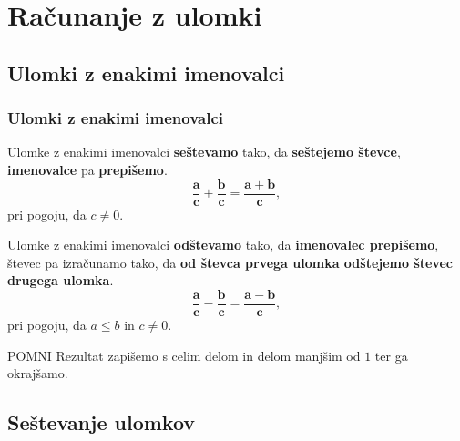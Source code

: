 \section{Računanje z ulomki}

\begin{frame}
    \sectionpage
\end{frame}

\begin{frame}
\end{frame}

    \subsection{Ulomki z enakimi imenovalci}

        \begin{frame}[t]
            \frametitle{Ulomki z enakimi imenovalci}

            \begin{alertblock}{}
                Ulomke z enakimi imenovalci \textbf{seštevamo} tako, da \textbf{seštejemo števce}, \textbf{imenovalce} pa \textbf{prepišemo}.
                $$ \mathbf{\frac{a}{c}+\frac{b}{c}=\frac{a+b}{c}}, $$ pri pogoju, da $c\neq 0$.

                Ulomke z enakimi imenovalci \textbf{odštevamo} tako, da \textbf{imenovalec prepišemo}, števec pa izračunamo tako, da \textbf{od števca prvega ulomka odštejemo števec drugega ulomka}.
                $$ \mathbf{\frac{a}{c}-\frac{b}{c}=\frac{a-b}{c}}, $$ pri pogoju, da $a\leq b$ in $c\neq 0$.
            \end{alertblock}
        \end{frame}

        \begin{frame}[t]
            \begin{block}{POMNI}
                Rezultat zapišemo s celim delom in delom manjšim od $1$ ter ga okrajšamo.
            \end{block}
        \end{frame}

    \subsection{Seštevanje ulomkov}

